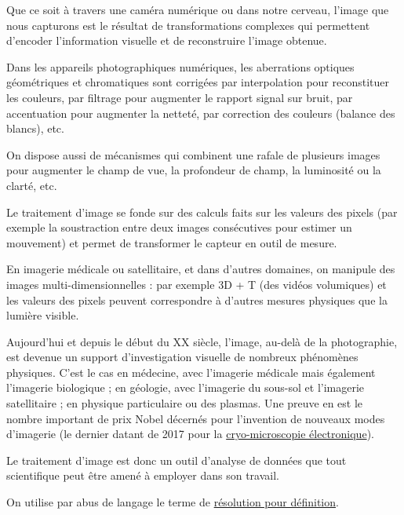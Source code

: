 \begin{jazzitemize}
\item Que ce soit à travers une caméra numérique ou dans notre cerveau, l'image que nous capturons est le résultat de transformations complexes qui permettent d'encoder l'information visuelle et de reconstruire l'image obtenue.
\item Dans les appareils photographiques numériques,  les aberrations optiques géométriques et chromatiques sont corrigées par interpolation pour reconstituer les couleurs, par filtrage pour augmenter le rapport signal sur bruit, par accentuation pour augmenter la netteté, par correction des couleurs (balance des blancs), etc.
\item On dispose aussi de mécanismes qui combinent une rafale de plusieurs images pour augmenter le champ de vue, la profondeur de champ, la luminosité ou la clarté, etc.
\item Le traitement d'image se fonde sur des calculs faits sur les valeurs des pixels (par exemple la soustraction entre deux images consécutives pour estimer un mouvement) et permet de transformer le capteur en outil de mesure.
\item En imagerie médicale ou satellitaire, et dans d'autres domaines, on manipule des images multi-dimensionnelles : par exemple 3D + T (des vidéos volumiques) et les valeurs des pixels peuvent correspondre à d'autres mesures physiques que la lumière visible.
\item Aujourd'hui et depuis le début du XX siècle, l'image, au-delà de la photographie, est devenue un support d'investigation visuelle de nombreux phénomènes physiques. C'est le cas en médecine, avec l'imagerie médicale mais également l'imagerie biologique ; en géologie, avec l'imagerie du sous-sol et l'imagerie satellitaire ; en physique particulaire ou des plasmas. Une preuve en est le nombre important de prix Nobel décernés pour l'invention de nouveaux modes d'imagerie (le dernier datant de 2017 pour la \href{https://www.medecinesciences.org/en/articles/medsci/full_html/2017/11/medsci20173312p1111/medsci20173312p1111.html}{cryo-microscopie électronique}).
\item Le traitement d'image est donc un outil d'analyse de données que tout scientifique peut être amené à employer dans son travail.
\item On utilise par abus de langage le terme de \href{https://fr.wikipedia.org/wiki/R\%C3\%A9solution_spatiale_des_images_matricielles}{résolution pour définition}.
\end{jazzitemize}


